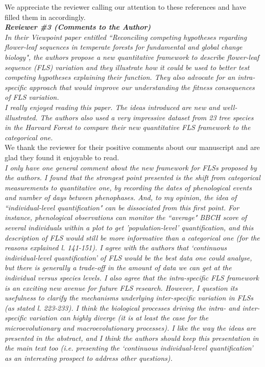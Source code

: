 \documentclass{article}[11pt]
\begin{document}
\noindent We appreciate the reviewer calling our attention to these references and have filled them in accordingly.\\

\emph{{\bf Reviewer \#3 (Comments to the Author)}}\\

\emph{In their Viewpoint paper entitled ``Reconciling competing hypotheses regarding flower-leaf sequences in temperate forests for fundamental and global change biology", the authors propose a new quantitative framework to describe flower-leaf sequence (FLS) variation and they illustrate how it could be used to better test competing hypotheses explaining their function. They also advocate for an intra-specific approach that would improve our understanding the fitness consequences of FLS variation.}\\

\emph{I really enjoyed reading this paper. The ideas introduced are new and well-illustrated. The authors also used a very impressive dataset from 23 tree species in the Harvard Forest to compare their new quantitative FLS framework to the categorical one.}\\

\noindent We thank the reviewer for their positive comments about our manuscript and are glad they found it enjoyable to read.\\

\emph{I only have one general comment about the new framework for FLSs proposed by the authors. I found that the strongest point presented is the shift from categorical measurements to quantitative one, by recording the dates of phenological events and number of days between phenophases. And, to my opinion, the idea of ``individual-level quantification" can be dissociated from this first point. For instance, phenological observations can monitor the ``average" BBCH score of several individuals within a plot to get 'population-level' quantification, and this description of FLS would still be more informative than a categorical one (for the reasons explained l. 141-151). I agree with the authors that `continuous individual-level quantification' of FLS would be the best data one could analyse, but there is generally a trade-off in the amount of data we can get at the individual versus species levels. I also agree that the intra-specific FLS framework is an exciting new avenue for future FLS research. However, I question its usefulness to clarify the mechanisms underlying inter-specific variation in FLSs (as stated l. 223-233). I think the biological processes driving the intra- and inter-specific variation can highly diverge (it is at least the case for the microevolutionary and macroevolutionary processes). I like the way the ideas are presented in the abstract, and I think the authors should keep this presentation in the main text too (i.e. presenting the  `continuous individual-level quantification' as an interesting prospect to address other questions).}
\end{document}
